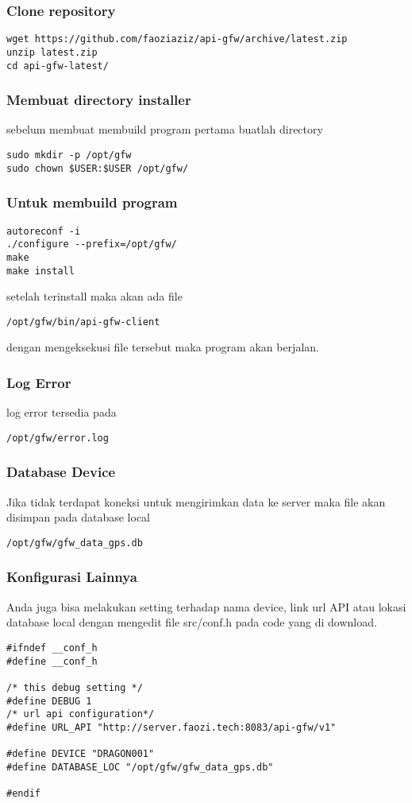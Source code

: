 \documentclass[11pt]{article}
\begin{document}
\subsubsection{Clone repository}
\label{sec:org332e228}
\begin{verbatim}
wget https://github.com/faoziaziz/api-gfw/archive/latest.zip
unzip latest.zip
cd api-gfw-latest/
\end{verbatim}
\subsubsection{Membuat directory installer}
\label{sec:org849e891}
sebelum membuat membuild program pertama buatlah directory
\begin{verbatim}
sudo mkdir -p /opt/gfw 
sudo chown $USER:$USER /opt/gfw/
\end{verbatim}
\subsubsection{Untuk membuild program}
\label{sec:orgb8f2311}
\begin{verbatim}
autoreconf -i
./configure --prefix=/opt/gfw/
make 
make install
\end{verbatim}
setelah terinstall maka akan ada file 
\begin{verbatim}
/opt/gfw/bin/api-gfw-client
\end{verbatim}
dengan mengeksekusi file tersebut maka program akan berjalan.
\subsubsection{Log Error}
\label{sec:org260428d}
log error tersedia pada 
\begin{verbatim}
/opt/gfw/error.log
\end{verbatim}
\subsubsection{Database Device}
\label{sec:orgd6d7b0b}
Jika tidak terdapat koneksi untuk mengirimkan data ke server maka file akan disimpan pada 
database local 
\begin{verbatim}
/opt/gfw/gfw_data_gps.db
\end{verbatim}
\subsubsection{Konfigurasi Lainnya}
\label{sec:org7ab5aa8}
Anda juga bisa melakukan setting terhadap nama device, link url API atau  lokasi database local
dengan mengedit file src/conf.h pada code yang di download.
\begin{verbatim}
#ifndef __conf_h
#define __conf_h

/* this debug setting */
#define DEBUG 1
/* url api configuration*/
#define URL_API "http://server.faozi.tech:8083/api-gfw/v1"

#define DEVICE "DRAGON001"
#define DATABASE_LOC "/opt/gfw/gfw_data_gps.db"

#endif
\end{verbatim}
\end{document}
